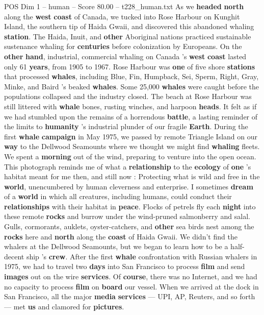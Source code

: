 \begin{textsample}{POS Dim 1 – human – Score 80.00 – t228\_human.txt}
As we \textbf{headed} \textbf{north} along the \textbf{west} \textbf{coast} of Canada, we tucked into Rose Harbour on Kunghit Island, the southern tip of Haida Gwaii, and discovered this abandoned whaling \textbf{station}.
The Haida, Inuit, and \textbf{other} Aboriginal nations practiced sustainable sustenance whaling for \textbf{centuries} before colonization by Europeans.
On the \textbf{other} \textbf{hand}, industrial, commercial whaling on Canada ’s \textbf{west} \textbf{coast} lasted only 61 \textbf{years}, from 1905 to 1967.
Rose Harbour was \textbf{one} of five shore \textbf{stations} that processed \textbf{whales}, including Blue, Fin, Humpback, Sei, Sperm, Right, Gray, Minke, and Baird ’s beaked \textbf{whales}.
Some 25,000 \textbf{whales} were caught before the populations collapsed and the industry closed.
The beach at Rose Harbour was still littered with \textbf{whale} bones, rusting winches, and harpoon \textbf{heads}.
It felt as if we had stumbled upon the remains of a horrendous \textbf{battle}, a lasting reminder of the limits to \textbf{humanity} ’s industrial plunder of our fragile \textbf{Earth}.
During the first \textbf{whale} \textbf{campaign} in May 1975, we passed by remote Triangle Island on our \textbf{way} to the Dellwood Seamounts where we thought we might find \textbf{whaling} fleets.
We spent a \textbf{morning} out of the wind, preparing to venture into the open ocean.
This photograph reminds me of what a \textbf{relationship} to the \textbf{ecology} of \textbf{one} ’s habitat meant for me then, and still now : Protecting what is wild and free in the \textbf{world}, unencumbered by human cleverness and enterprise.
I sometimes \textbf{dream} of a \textbf{world} in which all creatures, including humans, could conduct their \textbf{relationships} with their habitat in \textbf{peace}.
Flocks of petrels fly each \textbf{night} into these remote \textbf{rocks} and burrow under the wind-pruned salmonberry and salal.
Gulls, cormorants, auklets, oyster-catchers, and \textbf{other} sea birds nest among the \textbf{rocks} here and \textbf{north} along the \textbf{coast} of Haida Gwaii.
We didn't find the whalers at the Dellwood Seamounts, but we began to learn how to be a half-decent ship ’s \textbf{crew}.
After the first \textbf{whale} confrontation with Russian whalers in 1975, we had to travel two \textbf{days} into San Francisco to process \textbf{film} and send \textbf{images} out on the wire \textbf{services}.
Of \textbf{course}, there was no Internet, and we had no capacity to process \textbf{film} on \textbf{board} our vessel.
When we arrived at the dock in San Francisco, all the major \textbf{media} \textbf{services} — UPI, AP, Reuters, and so forth — met \textbf{us} and clamored for \textbf{pictures}.

\end{textsample}
